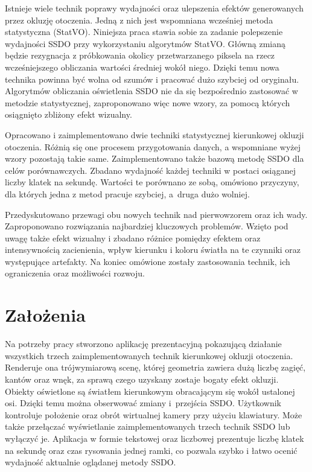 	Istnieje wiele technik poprawy wydajności oraz ulepszenia efektów generowanych przez okluzję otoczenia. Jedną z nich jest wspomniana wcześniej metoda statystyczna (StatVO). Niniejsza praca stawia sobie za zadanie polepszenie wydajności SSDO przy wykorzystaniu algorytmów StatVO. Główną zmianą będzie rezygnacja z próbkowania okolicy przetwarzanego piksela na rzecz wcześniejszego obliczania wartości średniej wokół niego. Dzięki temu nowa technika powinna być wolna od szumów i pracować dużo szybciej od oryginału. Algorytmów obliczania oświetlenia SSDO nie da się bezpośrednio zastosować w metodzie statystycznej, zaproponowano więc nowe wzory, za pomocą których osiągnięto zbliżony efekt wizualny.
	
	Opracowano i zaimplementowano dwie techniki statystycznej kierunkowej okluzji otoczenia. Różnią się one procesem przygotowania danych, a wspomniane wyżej wzory pozostają takie same. Zaimplementowano także bazową metodę SSDO dla celów porównawczych. Zbadano wydajność każdej techniki w postaci osiąganej liczby klatek na sekundę. Wartości te porównano ze sobą, omówiono przyczyny, dla których jedna z metod pracuje szybciej, a~druga dużo wolniej. 
	
	Przedyskutowano przewagi obu nowych technik nad pierwowzorem oraz ich wady. Zaproponowano rozwiązania najbardziej kluczowych problemów. Wzięto pod uwagę także efekt wizualny i zbadano różnice pomiędzy efektem oraz intensywnością zacienienia, wpływ kierunku i koloru światła na te czynniki oraz występujące artefakty. Na koniec omówione zostały zastosowania technik, ich ograniczenia oraz możliwości rozwoju.
	
	
	\section{Założenia}
	\label{t:wprowadzenie:zalozenia}
	
	
	Na potrzeby pracy stworzono aplikację prezentacyjną pokazującą działanie wszystkich trzech zaimplementowanych technik kierunkowej okluzji otoczenia. Renderuje ona trójwymiarową scenę, której geometria zawiera dużą liczbę zagięć, kantów oraz wnęk, za sprawą czego uzyskany zostaje bogaty efekt okluzji. Obiekty oświetlone są światłem kierunkowym obracającym się wokół ustalonej osi. Dzięki temu można obserwować zmiany i~przejścia SSDO. Użytkownik kontroluje położenie oraz obrót wirtualnej kamery przy użyciu klawiatury. Może także przełączać wyświetlanie zaimplementowanych trzech technik SSDO lub wyłączyć je. Aplikacja w formie tekstowej oraz liczbowej prezentuje liczbę klatek na sekundę oraz czas rysowania jednej ramki, co pozwala szybko i łatwo ocenić wydajność aktualnie oglądanej metody SSDO.
	
